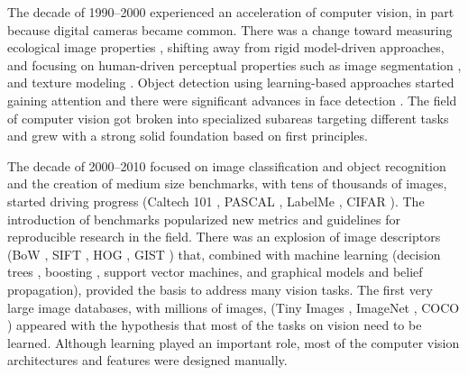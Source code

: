 The decade of 1990--2000 experienced an acceleration of computer vision, in part because digital cameras became common. There was a change toward measuring ecological image properties \cite{Gibson1979}, shifting away from rigid model-driven approaches, and focusing on human-driven perceptual properties such as image segmentation \cite{Shi00}, and texture modeling \cite{Bergen88,Malik90}. Object detection using learning-based approaches started gaining attention and there were significant advances in face detection \cite{Rowley1996,Leung1995,Moghaddam97}. The field of computer vision got broken into specialized subareas targeting different tasks and grew with a strong solid foundation based on first principles.


The decade of 2000--2010 focused on image classification and object recognition \cite{Viola01,Fergus07,Dalal2005,Felzenszwalb2010} and the creation of medium size benchmarks, with tens of thousands of images, started driving progress (Caltech 101 \cite{caltech101}, PASCAL \cite{Everingham2010}, LabelMe \cite{Russell2008}, CIFAR \cite{cifar100}). The introduction of benchmarks popularized new metrics and guidelines for reproducible research in the field. There was an explosion of image descriptors (BoW \cite{Csurka2004}, SIFT \cite{Lowe04}, HOG \cite{Dalal2005}, GIST \cite{oliva01}) that, combined with machine learning (decision trees \cite{Lepetit2006}, boosting \cite{Tieu00}, support vector machines, and graphical models and belief propagation), provided the basis to address many vision tasks. The first very large image databases, with millions of images, (Tiny Images \cite{torralba2008}, ImageNet \cite{russakovsky2015imagenet}, COCO \cite{lin2014microsoft}) appeared with the hypothesis that most of the tasks on vision need to be learned. Although learning played an important role, most of the computer vision architectures and features were designed manually. 

